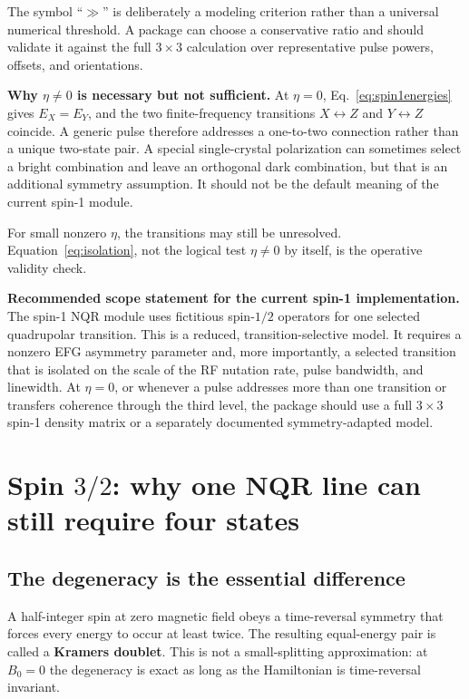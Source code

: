 \documentclass[11pt,letterpaper]{article}
\begin{document}
The symbol ``$\gg$'' is deliberately a modeling criterion rather than a universal numerical threshold. A package can choose a conservative ratio and should validate it against the full $3\times3$ calculation over representative pulse powers, offsets, and orientations.

\begin{cautionbox}
\textbf{Why $\eta\neq0$ is necessary but not sufficient.}
At $\eta=0$, Eq.~\eqref{eq:spin1energies} gives $E_X=E_Y$, and the two finite-frequency transitions $X\leftrightarrow Z$ and $Y\leftrightarrow Z$ coincide. A generic pulse therefore addresses a one-to-two connection rather than a unique two-state pair. A special single-crystal polarization can sometimes select a bright combination and leave an orthogonal dark combination, but that is an additional symmetry assumption. It should not be the default meaning of the current spin-1 module.

For small nonzero $\eta$, the transitions may still be unresolved. Equation~\eqref{eq:isolation}, not the logical test $\eta\neq0$ by itself, is the operative validity check.
\end{cautionbox}

\begin{scopebox}
\textbf{Recommended scope statement for the current spin-1 implementation.}
The spin-1 NQR module uses fictitious spin-$1/2$ operators for one selected quadrupolar transition. This is a reduced, transition-selective model. It requires a nonzero EFG asymmetry parameter and, more importantly, a selected transition that is isolated on the scale of the RF nutation rate, pulse bandwidth, and linewidth. At $\eta=0$, or whenever a pulse addresses more than one transition or transfers coherence through the third level, the package should use a full $3\times3$ spin-1 density matrix or a separately documented symmetry-adapted model.
\end{scopebox}

\section{Spin $3/2$: why one NQR line can still require four states}

\subsection{The degeneracy is the essential difference}

A half-integer spin at zero magnetic field obeys a time-reversal symmetry that forces every energy to occur at least twice. The resulting equal-energy pair is called a \textbf{Kramers doublet}. This is not a small-splitting approximation: at $B_0=0$ the degeneracy is exact as long as the Hamiltonian is time-reversal invariant.
\end{document}
